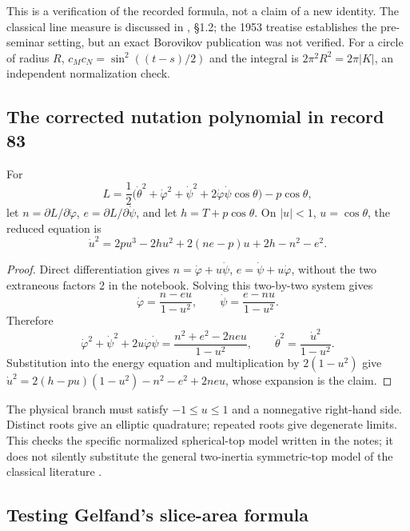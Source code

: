 This is a verification of the recorded formula, not a claim of a new
identity. The classical line measure is discussed in
\citet{santalo1989integral}, \S1.2; the 1953 treatise
\citep{santalo1953introduction} establishes the pre-seminar setting,
but an exact Borovikov publication was not verified. \oursComputed{}
For a circle of radius
\(R\), \(c_Mc_N=\sin^2((t-s)/2)\) and the integral is
\(2\pi^2R^2=2\pi|K|\), an independent normalization check.

\subsection{The corrected nutation polynomial in record 83}

\begin{proposition}\ours
For
\[
 L=\frac12\bigl(\dot\theta^2+\dot\varphi^2+\dot\psi^2
       +2\dot\varphi\dot\psi\cos\theta\bigr)-p\cos\theta,
\]
let \(n=\partial L/\partial\dot\varphi\),
\(e=\partial L/\partial\dot\psi\), and let \(h=T+p\cos\theta\).
On \(|u|<1\), \(u=\cos\theta\), the reduced equation is
\[
 \dot u^2=2pu^3-2hu^2+2(ne-p)u+2h-n^2-e^2.
\]
\end{proposition}

\begin{proof}
Direct differentiation gives
\(n=\dot\varphi+u\dot\psi\),
\(e=\dot\psi+u\dot\varphi\), without the two extraneous factors 2
in the notebook. Solving this two-by-two system gives
\[
 \dot\varphi=\frac{n-eu}{1-u^2},\qquad
 \dot\psi=\frac{e-nu}{1-u^2}.
\]
Therefore
\[
 \dot\varphi^2+\dot\psi^2+2u\dot\varphi\dot\psi
   =\frac{n^2+e^2-2neu}{1-u^2},\qquad
 \dot\theta^2=\frac{\dot u^2}{1-u^2}.
\]
Substitution into the energy equation and multiplication by
\(2(1-u^2)\) give
\(\dot u^2=2(h-pu)(1-u^2)-n^2-e^2+2neu\), whose expansion is the claim.
\end{proof}

The physical branch must satisfy \(-1\leq u\leq1\) and a nonnegative
right-hand side. Distinct roots give an elliptic quadrature; repeated roots
give degenerate limits. This checks the specific normalized spherical-top
model written in the notes; it does not silently substitute the general
two-inertia symmetric-top model of the classical literature
\citep{klein1897top}.

\subsection{Testing Gelfand's slice-area formula}

